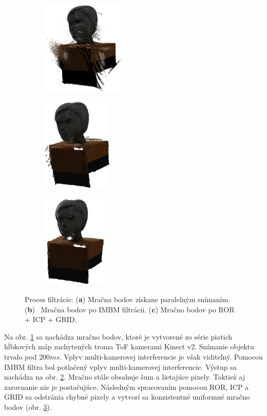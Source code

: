 \begin{figure}[H]
	\centering
	\begin{subfigure}[b]{0.32\textwidth}
		\centering
		\includegraphics[height=4.5cm]{figures/model_input.png}
		\caption{}
		\label{fig:model:input}
	\end{subfigure}
	\hfill
	\begin{subfigure}[b]{0.32\textwidth}
		\centering
		\includegraphics[height=4.5cm]{figures/model_orig.png}
		\caption{}
		\label{fig:model:imbm}
	\end{subfigure}
	\hfill
	\begin{subfigure}[b]{0.32\textwidth}
		\centering
		\includegraphics[height=4.5cm]{figures/model_output.png}
		\caption{}
		\label{fig:model:result}
	\end{subfigure}
	\caption{Proces filtrácie: (\textbf{a}) Mračna bodov získane paralelným snímaním. (\textbf{b}) \, Mračna bodov po IMBM filtrácii. (\textbf{c}) Mračno bodov po ROR + ICP + GRID.}
	\label{fig:model}
\end{figure}


Na obr. \ref{fig:model:input} sa nachádza mračno bodov, ktoré je vytvorené zo série piatich hĺbkových máp zachytených troma ToF kamerami Kinect v2. Snímanie objektu trvalo pod $200ms$. Vplyv multi-kamerovej interferencie je však viditeľný. Pomocou IMBM filtra bol potlačený vplyv multi-kamerovej interferencie. Výstup sa nachádza na obr. \ref{fig:model:imbm}. Mračno stále obsahuje šum a lietajúce pixely. Taktiež aj zarovnanie nie je postačujúce. Následným spracovaním pomocou ROR, ICP a GRID sa odstránia chybné pixely a vytvorí sa konzistentné uniformné mračno bodov (obr. \ref{fig:model:result}).



